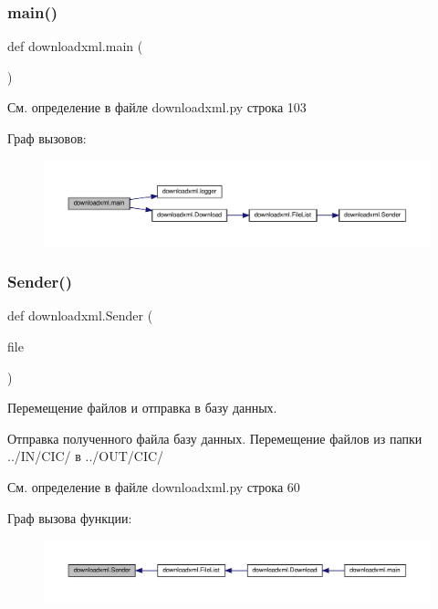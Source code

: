 \subsubsection{\texorpdfstring{main()}{main()}}
{\footnotesize\ttfamily def downloadxml.\+main (\begin{DoxyParamCaption}{ }\end{DoxyParamCaption})}



См. определение в файле downloadxml.\+py строка 103

Граф вызовов\+:\nopagebreak
\begin{figure}[H]
\begin{center}
\leavevmode
\includegraphics[width=350pt]{namespacedownloadxml_ac0d6bf93a1be6263a0b94ef18bb9c459_cgraph}
\end{center}
\end{figure}
\mbox{\label{namespacedownloadxml_a7f19cfa93073885f474cf6a2a3f25e7f}} 
\subsubsection{\texorpdfstring{Sender()}{Sender()}}
{\footnotesize\ttfamily def downloadxml.\+Sender (\begin{DoxyParamCaption}\item[{}]{file }\end{DoxyParamCaption})}



Перемещение файлов и отправка в базу данных. 

Отправка полученного файла базу данных. Перемещение файлов из папки \textquotesingle{}../\+I\+N/\+C\+I\+C/\textquotesingle{} в \textquotesingle{}../\+O\+U\+T/\+C\+I\+C/\textquotesingle{} 

См. определение в файле downloadxml.\+py строка 60

Граф вызова функции\+:\nopagebreak
\begin{figure}[H]
\begin{center}
\leavevmode
\includegraphics[width=350pt]{namespacedownloadxml_a7f19cfa93073885f474cf6a2a3f25e7f_icgraph}
\end{center}
\end{figure}


